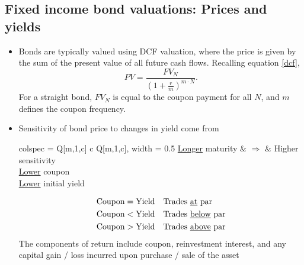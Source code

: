 \documentclass[../notes_compiled.tex]{subfiles}
\begin{document}
\subsection{Fixed income bond valuations: Prices and yields}
\begin{itemize}
\item Bonds are typically valued using DCF valuation, where the price is given by the sum of the present value of all future cash flows. Recalling equation \ref{dcf},
\begin{equation*}
PV = \frac{FV_{N}}{\left( 1+\frac{r}{m}\right)^{m\cdot N}}.
\end{equation*}
For a straight bond, $FV_{N}$ is equal to the coupon payment for all $N$, and $m$ defines the coupon frequency.
\item Sensitivity of bond price to changes in yield come from
\begin{table}[h!]
\centering
\begin{tblr}{colspec = {Q[m,1,c] c Q[m,1,c]}, width = 0.5\textwidth}
\underline{Longer} maturity &   $\Longrightarrow$ &  Higher sensitivity \\
\underline{Lower} coupon \\
\underline{Lower} initial yield
\end{tblr}
\end{table}
\begin{align*}
\text{Coupon}&=\text{Yield} & &\text{Trades \underline{at} par} \\
\text{Coupon}&<\text{Yield} & &\text{Trades \underline{below} par} \\
\text{Coupon}&>\text{Yield} & &\text{Trades \underline{above} par} \\
\end{align*}
The components of return include coupon, reinvestment interest, and any capital gain / loss incurred upon purchase / sale of the asset
\end{itemize}
\end{document}
